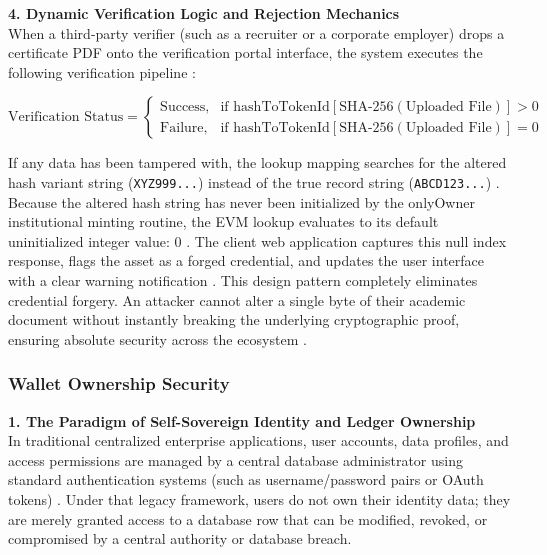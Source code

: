\textbf{4. Dynamic Verification Logic and Rejection Mechanics}\\

When a third-party verifier (such as a recruiter or a corporate employer) drops a certificate PDF onto the verification portal interface, the system executes the following verification pipeline \cite{hardhat2026ethereum}:

$$\text{Verification Status} = \begin{cases}
        \text{Success}, & \text{if } \text{hashToTokenId}[\text{SHA-256}(\text{Uploaded File})] > 0 \\
        \text{Failure}, & \text{if } \text{hashToTokenId}[\text{SHA-256}(\text{Uploaded File})] = 0
    \end{cases}$$


If any data has been tampered with, the lookup mapping searches for the altered hash variant string (\texttt{XYZ999...}) instead of the true record string (\texttt{ABCD123...}) \cite{onlinev0835web}. Because the altered hash string has never been initialized by the onlyOwner institutional minting routine, the EVM lookup evaluates to its default uninitialized integer value: 0 \cite{nfterc721web}. The client web application captures this null index response, flags the asset as a forged credential, and updates the user interface with a clear warning notification \cite{hardhat2026ethereum}. This design pattern completely eliminates credential forgery. An attacker cannot alter a single byte of their academic document without instantly breaking the underlying cryptographic proof, ensuring absolute security across the ecosystem \cite{muhamed2018eductx}.

\subsubsection{Wallet Ownership Security}

\textbf{1. The Paradigm of Self-Sovereign Identity and Ledger Ownership}\\

In traditional centralized enterprise applications, user accounts, data profiles, and access permissions are managed by a central database administrator using standard authentication systems (such as username/password pairs or OAuth tokens) \cite{hardhat2026ethereum}. Under that legacy framework, users do not own their identity data; they are merely granted access to a database row that can be modified, revoked, or compromised by a central authority or database breach.\\

